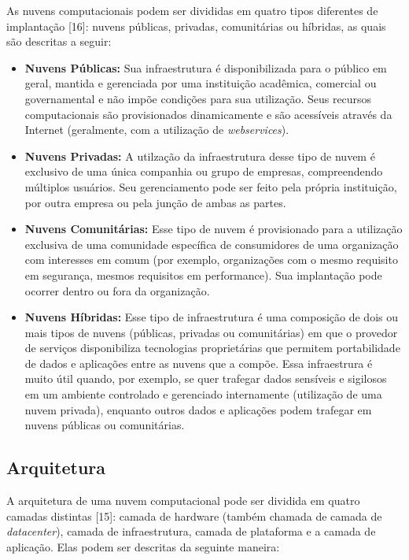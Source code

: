 As nuvens computacionais podem ser divididas em quatro tipos diferentes de implantação [16]: nuvens públicas, privadas, comunitárias ou híbridas, as quais são descritas a seguir: 

\begin{itemize}
	\item \textbf{Nuvens Públicas: } Sua infraestrutura é disponibilizada para o público em geral, mantida e gerenciada por uma instituição acadêmica, comercial ou governamental e não impõe condições para sua utilização. Seus recursos computacionais são provisionados dinamicamente e são acessíveis através da Internet (geralmente, com a utilização de \textit{webservices}).
	\item \textbf{Nuvens Privadas: } A utilzação da infraestrutura desse tipo de nuvem é exclusivo de uma única companhia ou grupo de empresas, compreendendo múltiplos usuários. Seu gerenciamento pode ser feito pela própria instituição, por outra empresa ou pela junção de ambas as partes.
	\item \textbf{Nuvens Comunitárias: } Esse tipo de nuvem é provisionado para a utilização exclusiva de uma comunidade específica de consumidores de uma organização com interesses em comum (por exemplo, organizações com o mesmo requisito em segurança, mesmos requisitos em performance). Sua implantação pode ocorrer dentro ou fora da organização.
	\item \textbf{Nuvens Híbridas: } Esse tipo de infraestrutura é uma composição de dois ou mais tipos de nuvens (públicas, privadas ou comunitárias) em que o provedor de serviços disponibiliza tecnologias proprietárias que permitem portabilidade de dados e aplicações entre as nuvens que a compõe. Essa infraestrura é muito útil quando, por exemplo, se quer trafegar dados sensíveis e sigilosos em um ambiente controlado e gerenciado internamente (utilização de uma nuvem privada), enquanto outros dados e aplicações podem trafegar em nuvens públicas ou comunitárias.
\end{itemize}

\subsection{Arquitetura} \label{cap2sec2subsec3}

A arquitetura de uma nuvem computacional pode ser dividida em quatro camadas distintas \cite{cloud_360}[15]: camada de hardware (também chamada de camada de \textit{datacenter}), camada de infraestrutura, camada de plataforma e a camada de aplicação. Elas podem ser descritas da seguinte maneira:

